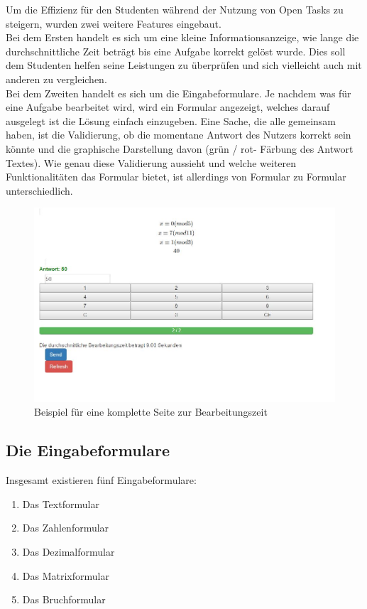 Um die Effizienz für den Studenten während der Nutzung von Open Tasks zu steigern, wurden zwei weitere Features eingebaut.\\ Bei dem Ersten handelt es sich um eine kleine Informationsanzeige, wie lange die durchschnittliche Zeit beträgt bis eine Aufgabe korrekt gelöst wurde. Dies soll dem Studenten helfen seine Leistungen zu überprüfen und sich vielleicht auch mit anderen zu vergleichen. \\
Bei dem Zweiten handelt es sich um die Eingabeformulare. Je nachdem was für eine Aufgabe bearbeitet wird, wird ein Formular angezeigt, welches darauf ausgelegt ist die Lösung einfach einzugeben. Eine Sache, die alle gemeinsam haben, ist die Validierung, ob die momentane Antwort des Nutzers korrekt sein könnte und die graphische Darstellung davon (grün / rot- Färbung des Antwort Textes). Wie genau diese Validierung aussieht und welche weiteren Funktionalitäten das Formular bietet, ist allerdings von Formular zu Formular unterschiedlich.

\begin{figure}[htp]     %
\centering
\includegraphics[width=1\textwidth]{bilder/TotalClient} 
\caption[Beispiel für eine komplette Seite zur Bearbeitungszeit]{Beispiel für eine komplette Seite zur Bearbeitungszeit}
\end{figure} 


\subsection{Die Eingabeformulare}

Insgesamt existieren fünf Eingabeformulare:
\begin{enumerate}
\itemsep0em
\item Das Textformular
\item Das Zahlenformular
\item Das Dezimalformular
\item Das Matrixformular
\item Das Bruchformular
\end{enumerate}

